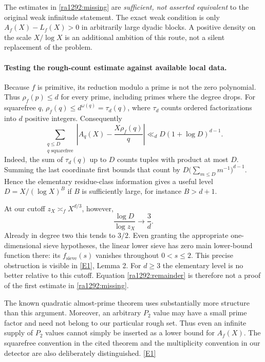 \documentclass[11pt]{article}
\newcommand{\eref}[2]{\hyperlink{extra:#1:#2}{[E#2]}}
\begin{document}
The estimates in \eqref{ra1292:missing} are \emph{sufficient, not asserted
equivalent} to the original weak infinitude statement. The exact weak
condition is only $A_f(X)-L_f(X)>0$ in arbitrarily large dyadic blocks.
A positive density on the scale $X/\log X$ is an additional ambition of this
route, not a silent replacement of the problem.

\paragraph{Testing the rough-count estimate against available local data.}
Because $f$ is primitive, its reduction modulo a prime is not the zero
polynomial. Thus $\rho_f(p)\le d$ for every prime, including primes where
the degree drops. For squarefree $q$,
$\rho_f(q)\le d^{\omega(q)}=\tau_d(q)$, where $\tau_d$ counts ordered
factorizations into $d$ positive integers. Consequently
\begin{equation}\label{ra1292:remainder}
 \sum_{\substack{q\le D\\q\text{ squarefree}}}
 \left|A_q(X)-\frac{X\rho_f(q)}q\right|
 \ll_d D(1+\log D)^{d-1}.
\end{equation}
Indeed, the sum of $\tau_d(q)$ up to $D$ counts tuples with product at most
$D$. Summing the last coordinate first bounds that count by
$D\bigl(\sum_{m\le D}m^{-1}\bigr)^{d-1}$.
Hence the elementary residue-class information gives a useful level
$D=X/(\log X)^B$ if $B$ is sufficiently large, for instance $B>d+1$.

At our cutoff $z_X\asymp_f X^{d/3}$, however,
\[
 \frac{\log D}{\log z_X}\longrightarrow\frac3d.
\]
Already in degree two this tends to $3/2$. Even granting the appropriate
one-dimensional sieve hypotheses, the linear lower sieve has zero main
lower-bound function there: its $f_{\mathrm{sieve}}(s)$ vanishes throughout
$0<s\le2$. This precise obstruction is visible in \eref{1292}{1}, Lemma 2.
For $d\ge3$ the elementary level is no better relative to this cutoff.
Equation \eqref{ra1292:remainder} is therefore not a proof of the first
estimate in \eqref{ra1292:missing}.

The known quadratic almost-prime theorem uses substantially more structure
than this argument. Moreover, an arbitrary $P_2$ value may have a small
prime factor and need not belong to our particular rough set. Thus even an
infinite supply of $P_2$ values cannot simply be inserted as a lower bound
for $A_f(X)$. The squarefree convention in the cited theorem and the
multiplicity convention in our detector are also deliberately distinguished.
\eref{1292}{1}
\end{document}
